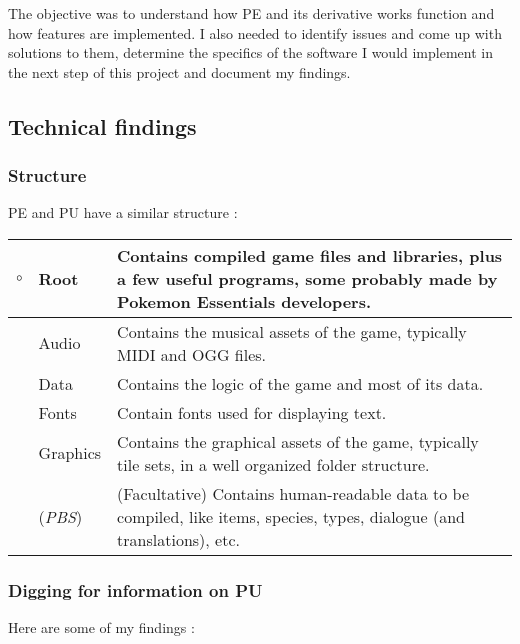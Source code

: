 \documentclass[11pt]{article}
\begin{document}
The objective was to understand how PE and its derivative works function and how features are implemented. I also needed to identify issues and come up with solutions to them, determine the specifics of the software I would implement in the next step of this project and document my findings.




\subsection{Technical findings}

\subsubsection{Structure}

PE and PU have a similar structure :

\begin{tabular}{|r L{.1\linewidth}|L{.8\linewidth}|}
	\hline
	$\circ$ & Root & Contains compiled game files and libraries, plus a few useful programs, some probably made by Pokemon Essentials developers. \\
	\hline
	 & Audio & Contains the musical assets of the game, typically MIDI and OGG files. \\
	\hline
	 & Data & Contains the logic of the game and most of its data.  \\
	\hline
	 & Fonts & Contain fonts used for displaying text. \\
	\hline
	 & Graphics & Contains the graphical assets of the game, typically tile sets, in a well organized folder structure. \\
	\hline
	 & (\textit{PBS}) & (Facultative) Contains human-readable data to be compiled, like items, species, types, dialogue (and translations), etc. \\
	\hline
\end{tabular}


\subsubsection{Digging for information on PU}

Here are some of my findings :
\end{document}
